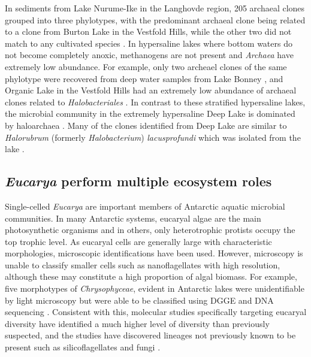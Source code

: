 In sediments from Lake Nurume-Ike in the Langhovde region, 205 archaeal clones grouped into three phylotypes, 
with the predominant archaeal clone being related to a clone from Burton Lake in the Vestfold Hills, while the other two did not match to any cultivated species \cite{Kurasawa2010}. 
In hypersaline lakes where bottom waters do not become completely anoxic, methanogens are not present and \emph{Archaea} have extremely low abundance. 
For example, only two archeael clones of the same phylotype were recovered from deep water samples from Lake Bonney \cite{Glatz2006}, 
and Organic Lake in the Vestfold Hills had an extremely low abundance of archaeal clones related to \emph{Halobacteriales} \cite{Bowman2000b}. 
In contrast to these stratified hypersaline lakes, the microbial community in the extremely hypersaline Deep Lake is dominated by haloarchaea \cite{Bowman2000b}. 
Many of the clones identified from Deep Lake are similar to \emph{Halorubrum} (formerly \emph{Halobacterium}) \emph{lacusprofundi} which was isolated from the lake \cite{Franzmann1988}. 

\subsection{\emph{Eucarya} perform multiple ecosystem roles}

Single-celled \emph{Eucarya} are important members of Antarctic aquatic microbial communities.
In many Antarctic systems, eucaryal algae are the main photosynthetic organisms and in others, only heterotrophic protists occupy the top trophic level. 
As eucaryal cells are generally large with characteristic morphologies, microscopic identifications have been used. 
However, microscopy is unable to classify smaller cells such as nanoflagellates with high resolution, although these may constitute a high proportion of algal biomass.
For example, five morphotypes of \emph{Chrysophyceae}, evident in Antarctic lakes were unidentifiable by light microscopy but were able to be classified using DGGE and DNA sequencing \cite{Unrein2005}.
Consistent with this, molecular studies specifically targeting eucaryal diversity \cite{Unrein2005, Mosier2007, Bielewicz2011} have identified a much higher level of diversity than previously suspected,
 and the studies have discovered lineages not previously known to be present such as silicoflagellates \cite{Unrein2005} and fungi \cite{Mosier2007, Bielewicz2011}.

